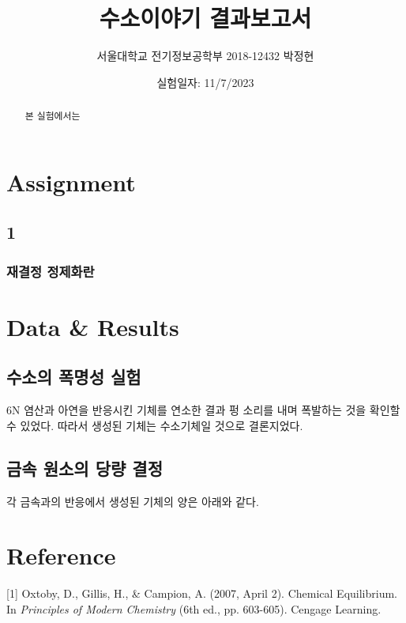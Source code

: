 \documentclass[%
 reprint,
 amsmath,amssymb,
 aps,
]{revtex4-2}
\begin{document}
\title{수소이야기 결과보고서}

\author{서울대학교 전기정보공학부 2018-12432 박정현}
\date{실험일자: 11/7/2023}%

\begin{abstract}
본 실험에서는 
\end{abstract}

\maketitle


\section{\label{sec:level1}Assignment}
\subsection{\label{sec:level2}1}
\subsubsection{\label{sec:level3}재결정 정제화란}

\section{\label{sec:level1}Data \& Results}
\subsection{\label{sec:level2}수소의 폭명성 실험}
6N 염산과 아연을 반응시킨 기체를 연소한 결과 펑 소리를 내며 폭발하는 것을 확인할 수 있었다. 따라서 생성된 기체는 수소기체일 것으로 결론지었다.

\subsection{\label{sec:level2}금속 원소의 당량 결정}
각 금속과의 반응에서 생성된 기체의 양은 아래와 같다.

\section{\label{sec:level1}Reference}
[1] Oxtoby, D., Gillis, H., \& Campion, A. (2007, April 2). Chemical Equilibrium. In \textit{Principles of Modern Chemistry} (6th ed., pp. 603-605). Cengage Learning.
\end{document}
